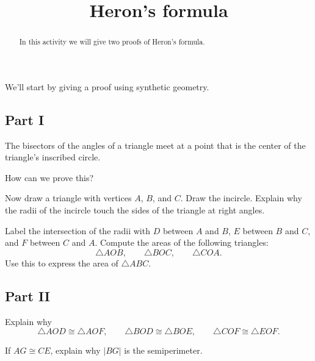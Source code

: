 \documentclass[nooutcomes]{ximera}
\title{Heron's formula}
\begin{document}
\begin{abstract}
In this activity we will give two proofs of Heron's formula.
\end{abstract}
\maketitle


We'll start by giving a proof using synthetic geometry. 

\subsection*{Part I}

\begin{proposition}
The bisectors of the angles of a triangle meet at a point that is the center of the triangle's inscribed circle.
\end{proposition}

\begin{question}
How can we prove this?
\end{question}

\begin{question}
Now draw a triangle with vertices $A$, $B$, and $C$. Draw the incircle. Explain why the radii of the incircle touch the sides of the triangle at right angles. 
\end{question}

\begin{question}
Label the intersection of the radii with $D$ between $A$ and $B$, $E$ between $B$ and $C$, and $F$ between $C$ and $A$. Compute the areas of the following triangles:
\[
\triangle AOB,\qquad \triangle BOC,\qquad \triangle COA.
\]
Use this to express the area of $\triangle ABC$. 
\end{question}

\subsection*{Part II}

\begin{question}
Explain why
\[
\triangle AOD \cong \triangle AOF,\qquad
\triangle BOD \cong \triangle BOE,\qquad
\triangle COF \cong \triangle EOF.
\]
\end{question}


\begin{question}
If $AG \cong CE$, explain why $|BG|$ is the semiperimeter. 
\end{question}
\end{document}
